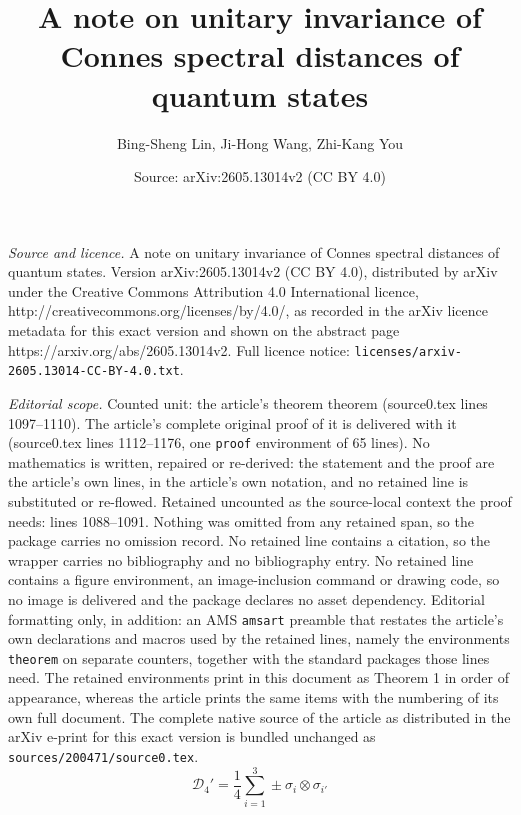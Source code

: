 \documentclass[10pt,a4paper]{amsart}
\title{A note on unitary invariance of Connes spectral distances of quantum states}
\author{Bing-Sheng Lin, Ji-Hong Wang, Zhi-Kang You}
\date{Source: arXiv:2605.13014v2 (CC BY 4.0)}
\begin{document}
\maketitle

\noindent\emph{Source and licence.} A note on unitary invariance of Connes spectral distances of quantum states. Version arXiv:2605.13014v2 (CC BY 4.0), distributed by arXiv under the Creative Commons Attribution 4.0 International licence, http://creativecommons.org/licenses/by/4.0/, as recorded in the arXiv licence metadata for this exact version and shown on the abstract page https://arxiv.org/abs/2605.13014v2. Full licence notice: \texttt{licenses/arxiv-2605.13014-CC-BY-4.0.txt}.\par\smallskip

\noindent\textit{Editorial scope.} Counted unit: the article's theorem theorem (source0.tex lines 1097--1110). The article's complete original proof of it is delivered with it (source0.tex lines 1112--1176, one \texttt{proof} environment of 65 lines). No mathematics is written, repaired or re-derived: the statement and the proof are the article's own lines, in the article's own notation, and no retained line is substituted or re-flowed.  Retained uncounted as the source-local context the proof needs: lines 1088--1091.  Nothing was omitted from any retained span, so the package carries no omission record.  No retained line contains a citation, so the wrapper carries no bibliography and no bibliography entry.  No retained line contains a figure environment, an image-inclusion command or drawing code, so no image is delivered and the package declares no asset dependency.  Editorial formatting only, in addition: an AMS \texttt{amsart} preamble that restates the article's own declarations and macros used by the retained lines, namely the environments \texttt{theorem} on separate counters, together with the standard packages those lines need.  The retained environments print in this document as Theorem 1 in order of appearance, whereas the article prints the same items with the numbering of its own full document.  The complete native source of the article as distributed in the arXiv e-print for this exact version is bundled unchanged as \texttt{sources/200471/source0.tex}.
  \begin{equation}\label{d4p}
    \mathcal{D}_4' = \frac{1}{4}  \sum_{i = 1}^3 \pm \sigma_i \otimes
    \sigma_{i'}
  \end{equation}
\end{document}
